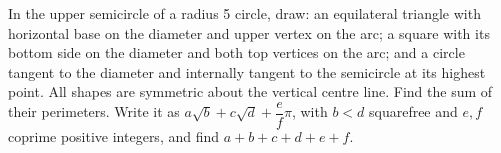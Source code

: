 In the upper semicircle of a radius 5 circle, draw: an equilateral triangle with horizontal base on the diameter and upper vertex on the arc; a square with its bottom side on the diameter and both top vertices on the arc; and a circle tangent to the diameter and internally tangent to the semicircle at its highest point. All shapes are symmetric about the vertical centre line. Find the sum of their perimeters. Write it as $a\sqrt b+c\sqrt d+\dfrac{e}{f}\pi$, with $b<d$ squarefree and $e,f$ coprime positive integers, and find $a+b+c+d+e+f$.
